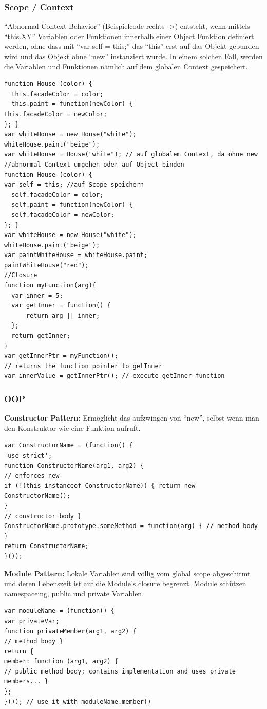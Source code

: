 \begin{multicols*}{4}
\subsubsection{Scope / Context}
“Abnormal Context Behavior” (Beispielcode rechts ->) entsteht, 
wenn mittels “this.XY” Variablen oder Funktionen innerhalb einer Object 
Funktion definiert werden, ohne dass mit “var self = this;” das “this” erst auf das Objekt 
gebunden wird und das Objekt ohne “new” instanziert wurde. 
In einem solchen Fall, werden die Variablen und Funktionen nämlich auf dem globalen Context gespeichert.
 \begin{verbatim}
function House (color) { 
  this.facadeColor = color; 
  this.paint = function(newColor) {
this.facadeColor = newColor;
}; }
var whiteHouse = new House("white"); 
whiteHouse.paint("beige");
var whiteHouse = House("white"); // auf globalem Context, da ohne new
//abnormal Context umgehen oder auf Object binden
function House (color) {
var self = this; //auf Scope speichern
  self.facadeColor = color; 
  self.paint = function(newColor) {
  self.facadeColor = newColor;
}; }
var whiteHouse = new House("white"); 
whiteHouse.paint("beige");
var paintWhiteHouse = whiteHouse.paint; 
paintWhiteHouse("red");
//Closure
function myFunction(arg){
  var inner = 5;
  var getInner = function() {
      return arg || inner;
  };
  return getInner;
}
var getInnerPtr = myFunction(); 
// returns the function pointer to getInner 
var innerValue = getInnerPtr(); // execute getInner function
\end{verbatim}

\subsubsection{OOP}
\textbf{\color{MidnightBlue}Constructor Pattern:} Ermöglicht das
aufzwingen von “new”, selbst wenn man den
Konstruktor wie eine Funktion
aufruft.
 \begin{verbatim}
var ConstructorName = (function() {
'use strict';
function ConstructorName(arg1, arg2) {
// enforces new
if (!(this instanceof ConstructorName)) { return new ConstructorName();
}
// constructor body }
ConstructorName.prototype.someMethod = function(arg) { // method body
}
return ConstructorName;
}());
\end{verbatim}
\textbf{\color{MidnightBlue}Module Pattern:} Lokale Variablen
sind völlig vom global scope abgeschirmt und deren Lebenszeit ist auf
die Module’s closure begrenzt.
Module schützen namespaceing,
public und private Variablen.
 \begin{verbatim}
var moduleName = (function() {
var privateVar;
function privateMember(arg1, arg2) {
// method body }
return {
member: function (arg1, arg2) {
// public method body; contains implementation and uses private members... }
};
}()); // use it with moduleName.member()
\end{verbatim}


\end{multicols*}
